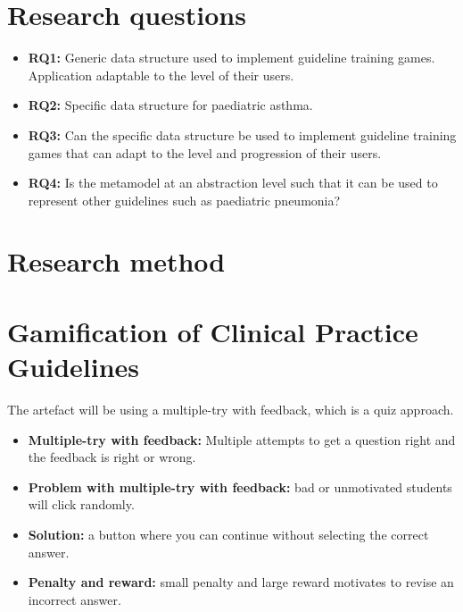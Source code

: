 \documentclass[20pt]{extarticle}
\begin{document}
	\section{Research questions}
	\begin{itemize}
		\item \textbf{RQ1:} Generic data structure used to implement guideline training games. Application adaptable to the level of their users.
		\item \textbf{RQ2:} Specific data structure for paediatric asthma. 
		\item \textbf{RQ3:} Can the specific data structure be used to implement guideline training games that can adapt to the level and progression of their users.
		\item \textbf{RQ4:} Is the metamodel at an abstraction level such that it can be used to represent other guidelines such as paediatric pneumonia?
	\end{itemize}
	
	\section{Research method}
	
		\section{Gamification of Clinical Practice Guidelines}
	The artefact will be using a multiple-try with feedback, which is a quiz approach.
	\begin{itemize}
		\item \textbf{Multiple-try with feedback:} Multiple attempts to get a question right and the feedback is right or wrong.
		\item \textbf{Problem with multiple-try with feedback:} bad or unmotivated students will click randomly.
		\item \textbf{Solution:} a button where you can continue without selecting the correct answer.
		\item \textbf{Penalty and reward:} small penalty and large reward motivates to revise an incorrect answer.
	\end{itemize}
	
\end{document}
